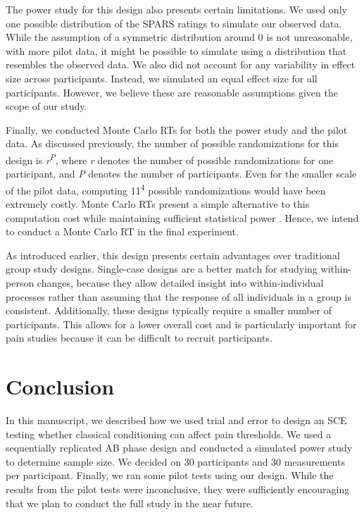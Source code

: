 \documentclass{article}
\begin{document}
The power study for this design also presents certain limitations. We used only one possible distribution of the SPARS ratings to simulate our observed data. While the assumption of a symmetric distribution around 0 is not unreasonable, with more pilot data, it might be possible to simulate using a distribution that resembles the observed data. We also did not account for any variability in effect size across participants. Instead, we simulated an equal effect size for all participants. However, we believe these are reasonable assumptions given the scope of our study. 

Finally, we conducted Monte Carlo RTs for both the power study and the pilot data. As discussed previously, the number of possible randomizations for this design is \emph{r}\textsuperscript{\emph{P}}, where \emph{r} denotes the number of possible randomizations for one participant, and \emph{P} denotes the number of participants. Even for the smaller scale of the pilot data, computing 11\textsuperscript{4} possible randomizations would have been extremely costly. Monte Carlo RTs present a simple alternative to this computation cost while maintaining sufficient statistical power \textcite{Edgington1969, Hope1968}. Hence, we intend to conduct a Monte Carlo RT in the final experiment.

As introduced earlier, this design presents certain advantages over traditional group study designs. Single-case designs are a better match for studying within-person changes, because they allow detailed insight into within-individual processes rather than assuming that the response of all individuals in a group is consistent. Additionally, these designs typically require a smaller number of participants. This allows for a lower overall cost and is particularly important for pain studies because it can be difficult to recruit participants.

\section{Conclusion}

In this manuscript, we described how we used trial and error to design an SCE testing whether classical conditioning can affect pain thresholds. We used a sequentially replicated AB phase design and conducted a simulated power study to determine sample size. We decided on 30 participants and 30 measurements per participant. Finally, we ran some pilot tests using our design. While the results from the pilot tests were inconclusive, they were sufficiently encouraging that we plan to conduct the full study in the near future.
\end{document}
